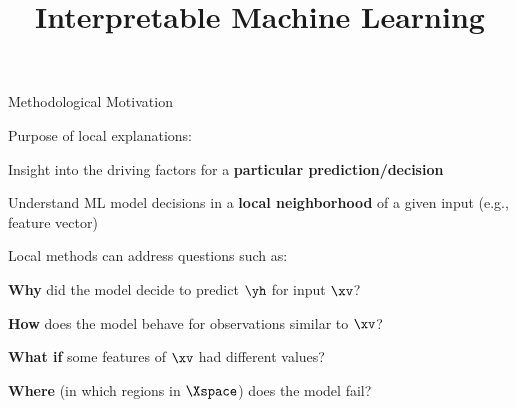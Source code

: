 \documentclass[10pt,compress,t,notes=noshow, xcolor=table]{beamer}
\title{Interpretable Machine Learning}
\begin{document}






\begin{framei}[align=top]{Methodological Motivation}
\item Purpose of local explanations:
\begin{itemizeS}
\item Insight into the driving factors for a \textbf{particular prediction/decision}
\item Understand ML model decisions in a \textbf{local neighborhood} of a given input (e.g., feature vector)
\end{itemizeS}
\spacer[0.25]
\pause
\item Local methods can address questions such as:
\begin{itemizeS}
\item \textbf{Why} did the model decide to predict $\yh$ for input $\xv$?
\item \textbf{How} does the model behave for observations similar to $\xv$?
\item \textbf{What if} some features of $\xv$ had different values?
\item \textbf{Where} (in which regions in $\Xspace$) does the model fail?
\end{itemizeS}
\end{framei}
\end{document}
